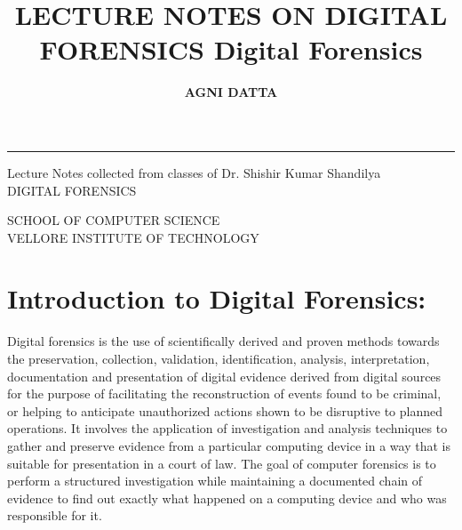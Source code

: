 \documentclass[british]{article}
\begin{document}
\medskip{}

\title{\textbf{\Huge{}LECTURE NOTES ON DIGITAL FORENSICS}{\Huge{}\vfill{}
}Digital Forensics}
\author{{\LARGE{}\vspace{1.5cm}
}\textbf{\LARGE{}AGNI DATTA}}
\maketitle
\begin{center}
{\LARGE{}\vfill{}
}{\LARGE\par}
\par\end{center}

\begin{center}
{\Huge{}\rule[0.5ex]{0.5\columnwidth}{0.5pt}}{\Huge\par}
\par\end{center}

\begin{center}
{\LARGE{}Lecture Notes collected from classes of Dr. Shishir Kumar
Shandilya}\\
{\LARGE{} DIGITAL FORENSICS}{\LARGE\par}
\par\end{center}

\begin{center}
{\LARGE{}\vfill{}
}{\Large{}SCHOOL OF COMPUTER SCIENCE}\\
{\Large{} VELLORE INSTITUTE OF TECHNOLOGY}\\
{\Large{} \vfill{}
}\pagebreak\tableofcontents{}
\par\end{center}

\newpage{}

\part{Introduction to Digital Forensics:}

Digital forensics is the use of scientifically derived and proven
methods towards the preservation, collection, validation, identification,
analysis, interpretation, documentation and presentation of digital
evidence derived from digital sources for the purpose of facilitating
the reconstruction of events found to be criminal, or helping to anticipate
unauthorized actions shown to be disruptive to planned operations.
It involves the application of investigation and analysis techniques
to gather and preserve evidence from a particular computing device
in a way that is suitable for presentation in a court of law. The
goal of computer forensics is to perform a structured investigation
while maintaining a documented chain of evidence to find out exactly
what happened on a computing device and who was responsible for it.
\end{document}
